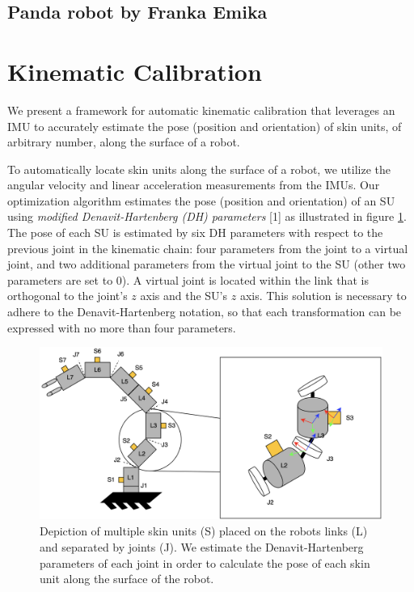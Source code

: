 \subsection{Panda robot by Franka Emika}

\section{Kinematic Calibration}
\label{s:calibration}

We present a framework for automatic kinematic calibration that leverages an
IMU to accurately estimate the pose (position and orientation) of skin units,
of arbitrary number, along the surface of a robot.

To automatically locate skin units along the surface of a robot,
we utilize the angular velocity and linear acceleration measurements from the IMUs.
Our optimization algorithm estimates the pose (position and orientation) of an SU
using \textit{modified Denavit-Hartenberg (DH) parameters} [1] as illustrated in figure \ref{fig:calibration_theory}.
The pose of each SU is estimated by six DH parameters with respect to the previous
joint in the kinematic chain: four parameters from the joint to a virtual joint,
and two additional parameters from the virtual joint to the SU (other two parameters are set to $0$).
A virtual joint is located within the link that is orthogonal to the joint’s $z$ axis and the SU’s $z$ axis.
This solution is necessary to adhere to the Denavit-Hartenberg notation,
so that each transformation can be expressed with no more than four parameters.

\begin{figure}[htbp]
    \caption[Calibration theory]{
        Depiction of multiple skin units (S) placed on the robots links (L) and separated by joints (J).
        We estimate the Denavit-Hartenberg parameters of each joint in order to calculate the pose of each skin unit along the surface of the robot.
    }
    \begin{center}
    \includegraphics[width=140mm]{figs/calibration_theory.png}
    \end{center}
\label{fig:calibration_theory}
\end{figure}

